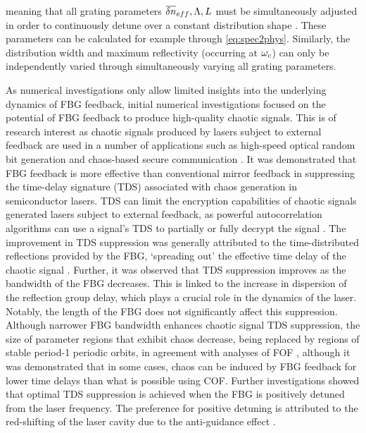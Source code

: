 meaning that all grating parameters $\overline{\delta n}_{eff}, \Lambda, L$ must be simultaneously adjusted in order to continuously detune over a constant distribution shape \cite{skenderas2024impact}. 
These parameters can be calculated for example through \eqref{eq:spec2phys}. 
Similarly, the distribution width and maximum reflectivity (occurring at $\omega_c$) can only be independently varied through simultaneously varying all grating parameters.
%
\par
%
As numerical investigations only allow limited insights into the underlying dynamics of FBG feedback, initial numerical investigations focused on the potential of FBG feedback to produce high-quality chaotic signals. 
This is of research interest as chaotic signals produced by lasers subject to external feedback are used in a number of applications such as high-speed optical random bit generation \cite{uchida2008fast} and chaos-based secure communication \cite{annovazzi2008secure}. 
It was demonstrated that FBG feedback is more effective than conventional mirror feedback in suppressing the time-delay signature (TDS) associated with chaos generation in semiconductor lasers. 
TDS can limit the encryption capabilities of chaotic signals generated lasers subject to external feedback, as powerful autocorrelation algorithms can use a signal's TDS to partially or fully decrypt the signal \cite{rontani2007loss}. 
The improvement in TDS suppression was generally attributed to the time-distributed reflections provided by the FBG, `spreading out' the effective time delay of the chaotic signal \cite{li2012distributed}. 
Further, it was observed that TDS suppression improves as the bandwidth of the FBG decreases. This is linked to the increase in dispersion of the reflection group delay, which plays a crucial role in the dynamics of the laser. 
Notably, the length of the FBG does not significantly affect this suppression. 
Although narrower FBG bandwidth enhances chaotic signal TDS suppression, the size of parameter regions that exhibit chaos decrease, being replaced by regions of stable period-1 periodic orbits, 
in agreement with analyses of FOF \cite{li2020stable}, although it was demonstrated that in some cases, 
chaos can be induced by FBG feedback for lower time delays than what is possible using COF. 
Further investigations showed that optimal TDS suppression is achieved when the FBG is positively detuned from the laser frequency. 
The preference for positive detuning is attributed to the red-shifting of the laser cavity due to the anti-guidance effect \cite{li2015chaotic}. 
%
